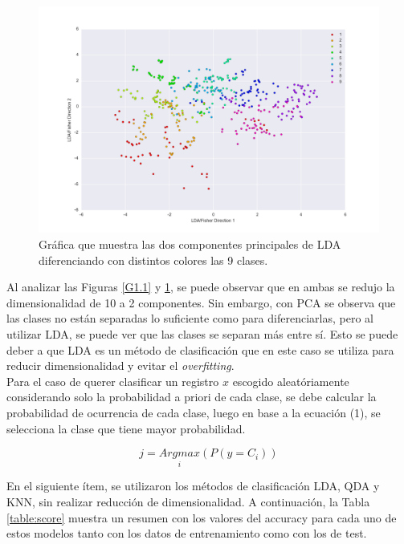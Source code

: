 \documentclass[letter, 10pt]{article}
\begin{document}
\begin{figure}[h!]
\begin{center}
\includegraphics[width=1\textwidth]{Images/figure_2.png}
\caption{Gráfica que muestra las dos componentes principales de LDA diferenciando con distintos colores las 9 clases.}
\label{G1.2}
\end{center}
\end{figure}

Al analizar las Figuras \ref{G1.1} y \ref{G1.2}, se puede observar que en ambas se redujo la dimensionalidad de 10 a 2 componentes. Sin embargo, con PCA se observa que las clases no están separadas lo suficiente como para diferenciarlas, pero al utilizar LDA, se puede ver que las clases se separan más entre sí. Esto se puede deber a que LDA es un método de clasificación que en este caso se utiliza para reducir dimensionalidad y evitar el \textit{overfitting}.\\

Para el caso de querer clasificar un registro $x$ escogido aleatóriamente considerando solo la probabilidad a priori de cada clase, se debe calcular la probabilidad de ocurrencia de cada clase, luego en base a la ecuación (1), se selecciona la clase que tiene mayor probabilidad.

\begin{equation}
j=\underset{i}{Argmax} (P(y=C_i))
\end{equation}

En el siguiente ítem, se utilizaron los métodos de clasificación LDA, QDA y KNN, sin realizar reducción de dimensionalidad. A continuación, la Tabla \ref{table:score} muestra un resumen con los valores del accuracy para cada uno de estos modelos tanto con los datos de entrenamiento como con los de test.
\end{document}
